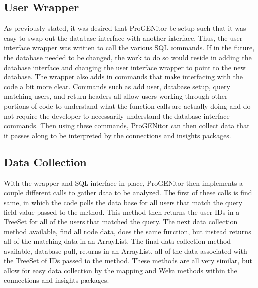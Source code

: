 \subsection{User Wrapper}
As previously stated, it was desired that ProGENitor be setup such that it was
easy to swap out the database interface with another interface.  Thus, the user
interface wrapper was written to call the various SQL commands.  If in the
future, the database needed to be changed, the work to do so would reside in
adding the database interface and changing the user interface wrapper to point
to the new database.  The wrapper also adds in commands that make interfacing
with the code a bit more clear.  Commands such as add user, database
setup, query matching users, and return headers all allow users working through
other portions of code to understand what the function calls are actually doing
and do not require the developer to necessarily understand the database
interface commands.  Then using these commands, ProGENitor can then collect
data that it passes along to be interpreted by the connections and insights
packages.

\subsection{Data Collection}
With the wrapper and SQL interface in place, ProGENitor then implements a couple
different calls to gather data to be analyzed.  The first of these calls is find
same, in which the code polls the data base for all users that match the query
field value passed to the method.  This method then returns the user IDs in a
TreeSet for all of the users that matched the query.  The next data collection
method available, find all node data, does the same function, but instead
returns all of the matching data in an ArrayList.  The final data collection method available,
database pull, returns in an ArrayList, all of the data associated with the
TreeSet of IDs passed to the method.  These methods are all very similar, but
allow for easy data collection by the mapping and Weka methods within the
connections and insights packages.
